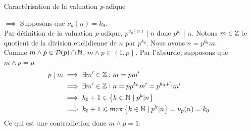 \documentclass{article}
\renewenvironment{question_kholle}[2][ ]
{
	\subsection{\texorpdfstring{#2}{}}
	\notblank{#1}
	{
		\noindent #1
		\bigbreak
	}
	{}
	\begin{proof}
}
{
	\end{proof}
}
\begin{document}
	\begin{question_kholle}
		[Soit $n \in \N^*, p \in \PRIME, k_0 \in \N$.
		\begin{equation}
			\nu_p(n) = k_0 \iff
			\exists m \in \Z : \left\{ \begin{matrix}
				n = p^{k_0} m \\
				m \wedge p = 1
			\end{matrix} \right.
		\end{equation}
		]
		{Caractérisation de la valuation \textit{p}-adique}

		$\implies$ Supposons que $\nu_p(n) = k_0$. \\
		Par définition de la valuation \textit{p}-adique, $p^{\nu_p(n)} \;|\; n$ donc $p^{k_0} \;|\; n$.
		Notons $m \in \mathbb Z$ le quotient de la division euclidienne de $n$ par $p^{k_0}$. Nous avons $n = p^{k_0} m$. \\
		Comme $m \wedge p \in \mathcal{D}(p) \cap \mathbb N$, $m \wedge p \in \left\{1,p\right\}$.
		Par l'absurde, supposons que $m \wedge p = p$.
		\begin{equation*}
			\begin{aligned}
				p \;|\; m
				&\implies \exists m' \in \mathbb Z : m = p m' \\
				&\implies \exists m' \in \mathbb Z : n = p p^{k_0} m' = p^{k_0+1} m' \\
				&\implies k_0 + 1 \in \left\{ k \in \mathbb N \;|\; p^k | n \right\} \\
				&\implies k_0 + 1 \leqslant \max \left\{ k \in \mathbb N \;|\; p^k | n \right\} = \nu_p(n) = k_0
			\end{aligned}
		\end{equation*}
		Ce qui est une contradiction donc $m \wedge p = 1$.


\end{question_kholle}
\end{document}
